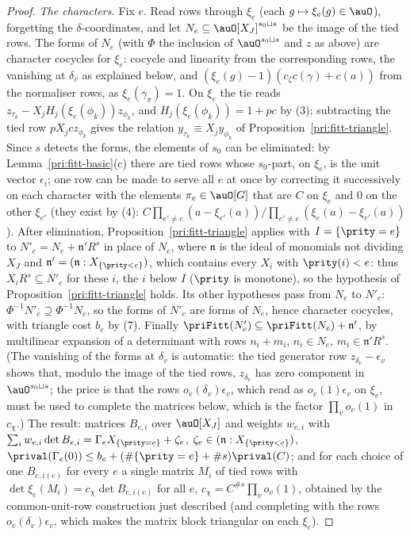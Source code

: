 \documentclass[10pt]{amsart}
\theoremstyle{definition}
\theoremstyle{remark}
\begin{document}
\begin{proof}
\emph{The characters.} Fix $e$. Read rows through $\xi_e$ (each $g\mapsto\xi_e(g)\in\auO$),
forgetting the $\delta$-coordinates, and let $N_e\subseteq\auO[X_J]^{s_0\sqcup s}$ be the image of
the tied rows. The forms of $N_e$ (with $\Phi$ the inclusion of $\auO^{s_0\sqcup s}$ and $z$ as
above) are character cocycles for $\xi_e$: cocycle and linearity from the corresponding rows, the
vanishing at $\delta_v$ as explained below, and $(\xi_e(g)-1)(c_\zeta c(\gamma)+c(a))$ from the normaliser rows, as
$\xi_e(\gamma_\pi)=1$. On $\xi_e$ the tie reads $z_{\tau_k}-X_jH_j(\xi_e(\phi_k))z_{\phi_k}$, and
$H_j(\xi_e(\phi_k))=1+pc$ by (3); subtracting the tied row $pX_jcz_{\phi_k}$ gives the relation
$y_{\tau_k}\equiv X_jy_{\phi_k}$ of Proposition~\ref{pri:fitt-triangle}. Since $s$ detects the forms,
the elements of $s_0$ can be eliminated: by Lemma~\ref{pri:fitt-basic}(c) there are tied rows whose
$s_0$-part, on $\xi_e$, is the unit vector $\epsilon_i$; one row can be made to serve all $e$ at once
by correcting it successively on each character with the elements $\pi_e\in\auO[G]$ that are $C$ on
$\xi_e$ and $0$ on the other $\xi_{e'}$ (they exist by (4): $C\prod_{e'\ne e}(a-\xi_{e'}(a))/
\prod_{e'\ne e}(\xi_e(a)-\xi_{e'}(a))$). After elimination, Proposition~\ref{pri:fitt-triangle}
applies with $I=\{\prity=e\}$ to $N'_e=N_e+\mathfrak n'R^{s}$ in place of $N_e$, where $\mathfrak n$ is
the ideal of monomials not dividing $X_J$ and $\mathfrak n'=(\mathfrak n:X_{\{\prity<e\}})$, which
contains every $X_i$ with $\prity(i)<e$: thus $X_iR^s\subseteq N'_e$ for these $i$, the $i$ below
$I$ ($\prity$ is monotone), so the hypothesis of Proposition~\ref{pri:fitt-triangle} holds. Its
other hypotheses pass from $N_e$ to $N'_e$: $\Phi^{-1}N'_e\supseteq\Phi^{-1}N_e$, so the forms of
$N'_e$ are forms of $N_e$, hence character cocycles, with triangle cost $b_e$ by (7). Finally
$\priFitt(N'_e)\subseteq\priFitt(N_e)+\mathfrak n'$, by multilinear expansion of a determinant with
rows $n_i+m_i$, $n_i\in N_e$, $m_i\in\mathfrak n'R^s$. (The vanishing of the forms at $\delta_v$ is
automatic: the tied generator row $z_{\delta_v}-\epsilon_v$ shows that, modulo the image of the tied
rows, $z_{\delta_v}$ has zero component in $\auO^{s_0\sqcup s}$; the price is that the rows $o_v(\delta_v)\epsilon_v$, which read as
$o_v(1)\epsilon_v$ on $\xi_e$, must be used to complete the matrices below, which is the factor
$\prod_vo_v(1)$ in $c_\chi$.) The result: matrices $B_{e,i}$ over $\auO[X_J]$ and
weights $w_{e,i}$ with $\sum_iw_{e,i}\det B_{e,i}=\Gamma_eX_{\{\prity=e\}}+\zeta_e$, $\zeta_e\in(
\mathfrak n:X_{\{\prity<e\}})$, $\prival(\Gamma_e(0))\le b_e+(\#\{\prity=e\}+\#s)\prival(C)$; and
for each choice of one $B_{e,i(e)}$ for every $e$ a single matrix $M_i$ of tied rows with
$\det\xi_e(M_i)=c_\chi\det B_{e,i(e)}$ for all $e$, $c_\chi=C^{\#s}\prod_vo_v(1)$, obtained by the
common-unit-row construction just described (and completing with the rows $o_v(\delta_v)\epsilon_v$,
which makes the matrix block triangular on each $\xi_e$).


\end{proof}
\end{document}
